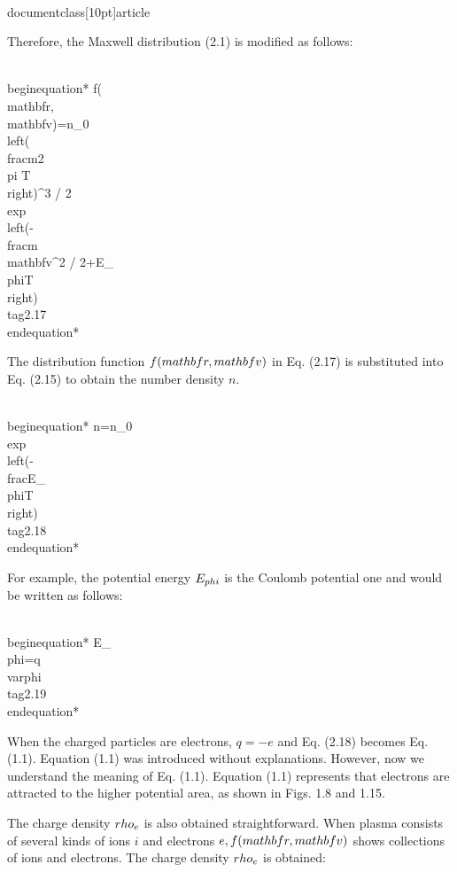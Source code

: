 \\documentclass[10pt]{article}
\begin{document}
Therefore, the Maxwell distribution (2.1) is modified as follows:


\\begin{equation*}
f(\\mathbf{r}, \\mathbf{v})=n_{0}\\left(\\frac{m}{2 \\pi T}\\right)^{3 / 2} \\exp \\left(-\\frac{m \\mathbf{v}^{2} / 2+E_{\\phi}}{T}\\right) \\tag{2.17}
\\end{equation*}


The distribution function $f(\\mathbf{r}, \\mathbf{v})$ in Eq. (2.17) is substituted into Eq. (2.15) to obtain the number density $n$.


\\begin{equation*}
n=n_{0} \\exp \\left(-\\frac{E_{\\phi}}{T}\\right) \\tag{2.18}
\\end{equation*}


For example, the potential energy $E_{\\phi}$ is the Coulomb potential one and would be written as follows:


\\begin{equation*}
E_{\\phi}=q \\varphi \\tag{2.19}
\\end{equation*}


When the charged particles are electrons, $q=-e$ and Eq. (2.18) becomes Eq. (1.1). Equation (1.1) was introduced without explanations. However, now we understand the meaning of Eq. (1.1). Equation (1.1) represents that electrons are attracted to the higher potential area, as shown in Figs. 1.8 and 1.15.

The charge density $\\rho_{e}$ is also obtained straightforward. When plasma consists of several kinds of ions $i$ and electrons $e, f(\\mathbf{r}, \\mathbf{v})$ shows collections of ions and electrons. The charge density $\\rho_{e}$ is obtained:
\end{document}
